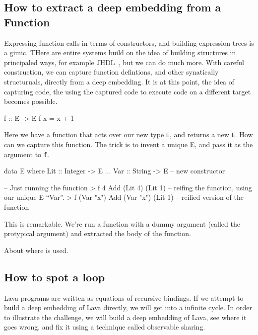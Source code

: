 \documentclass[11pt]{article}
\begin{document}
\subsection{How to extract a deep embedding from a Function}

Expressing function calls in terms of constructors,  and
building expression trees is a gimic. THere are entire
systems build on the idea of building structures 
in principaled ways, for example JHDL~\cite{..}, but
we can do much more. With careful construction,
we can capture function defintions,
and other synatically structuruals,
directly from a deep embedding. It is at this
point, the idea of capturing code,
the using the captured code to execute code
on a different target becomes possible.

\begin{Code}

f :: E -> E
f x = x + 1
        
\end{Code}

Here we have a function that acts over our new type
\verb|E|, and returns a new \verb|E|. How can we capture
this function.
The trick is to invent a unique E, and pass it as the argument
to \verb|f|.

\begin{Code}
data E where
  Lit :: Integer -> E
  ...
  Var :: String -> E    -- new constructor
\end{Code}        



\begin{Code}
-- Just running the function
> f 4
Add (Lit 4) (Lit 1)
-- reifing the function, using our unique E ``Var''.
> f (Var "x")
Add (Var "x") (Lit 1)   -- reified version of the function
\end{Code}

This is remarkable. We're run a function with 
a dummy argument (called the protypical argument)
and extracted the body of the function.

About where is used.

\subsection{How to spot a loop}

Lava programs are written as equations of recursive bindings.
If we attempt to build a deep embedding of Lava directly,
we will get into a infinite cycle. In order to illustrate
the challenge, we will build a deep embedding of Lava,
see where it goes wrong, and fix it using a technique called
observable sharing.
\end{document}
